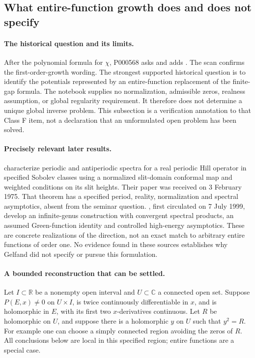 \subsection{What entire-function growth does and does not specify}
\label{audit:entire-data}

\paragraph{The historical question and its limits.}
After the polynomial formula for \(\chi\), P000568 asks
and adds . The scan confirms the first-order-growth
wording. The strongest supported historical question is to identify the potentials
represented by an entire-function replacement of the finite-gap formula. The
notebook supplies no normalization, admissible zeros, realness assumption, or
global regularity requirement. It therefore does not determine a unique global
inverse problem. This subsection is a verification annotation to that Class F
item, not a declaration that an unformulated open problem has been solved.

\paragraph{Precisely relevant later results.}
\citet[Thm.~5.1, pp.~535--536]{marchenko1975characterization} characterize
periodic and antiperiodic spectra for a real periodic Hill operator in specified
Sobolev classes using a normalized slit-domain conformal map and weighted
conditions on its slit heights. Their paper was received on 3 February 1975.
That theorem has a specified period, reality, normalization and spectral
asymptotics, absent from the seminar question. \citet[Hypotheses~3.1--3.2,
Eq.~(3.14), Lemmas~3.3--3.5]{gesztesy1999infinite}, first circulated on
7 July 1999, develop an infinite-genus construction with convergent spectral
products, an assumed Green-function identity and controlled high-energy
asymptotics. These are concrete realizations of the direction, not an exact
match to arbitrary entire functions of order one. No evidence found in these
sources establishes why Gelfand did not specify or pursue this formulation.

\paragraph{A bounded reconstruction that can be settled.}
Let \(I\subset\mathbb R\) be a nonempty open interval and \(U\subset\mathbb C\)
a connected open set. Suppose \(P(E,x)\ne0\) on \(U\times I\), is twice
continuously differentiable in \(x\), and is holomorphic in \(E\), with its first
two \(x\)-derivatives continuous. Let \(R\) be holomorphic on \(U\), and suppose
there is a holomorphic \(y\) on \(U\) such that \(y^2=R\). For example one can
choose a simply connected region avoiding the zeros of \(R\). All conclusions
below are local in this specified region; entire functions are a special case.

